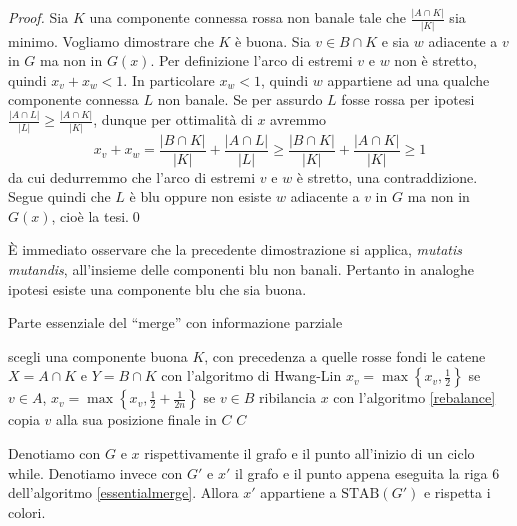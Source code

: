 \begin{proof}
	Sia \(K\) una componente connessa rossa non banale tale che \(\frac{|A\cap K|}{|K|}\) sia minimo. Vogliamo dimostrare che \(K\) è buona. Sia \(v\in B\cap K\) e sia \(w\) adiacente a \(v\) in \(G\) ma non in \(G(x)\). Per definizione l'arco di estremi \(v\) e \(w\) non è stretto, quindi \(x_v+x_w<1\). In particolare \(x_w<1\), quindi \(w\) appartiene ad una qualche componente connessa \(L\) non banale. Se per assurdo \(L\) fosse rossa per ipotesi \(\frac{|A\cap L|}{|L|}\ge\frac{|A\cap K|}{|K|}\), dunque per ottimalità di \(x\) avremmo
	\[x_v+x_w=\frac{|B\cap K|}{|K|}+\frac{|A\cap L|}{|L|}\ge\frac{|B\cap K|}{|K|}+\frac{|A\cap K|}{|K|}\ge 1\]
	da cui dedurremmo che l'arco di estremi \(v\) e \(w\) è stretto, una contraddizione. Segue quindi che \(L\) è blu oppure non esiste \(w\) adiacente a \(v\) in \(G\) ma non in \(G(x)\), cioè la tesi.\qed 
\end{proof}
È immediato osservare che la precedente dimostrazione si applica, \emph{mutatis mutandis}, all'insieme delle componenti blu non banali. Pertanto in analoghe ipotesi esiste una componente blu che sia buona. 
\begin{algorithm}
	\caption{Parte essenziale del ``merge'' con informazione parziale} \label{essentialmerge} 
	\begin{algorithmic}
		[1]  \STATE scegli una componente buona \(K\), con precedenza a quelle rosse \STATE fondi le catene \(X=A\cap K\) e \(Y=B\cap K\) con l'algoritmo di Hwang-Lin  \STATE \(x_v=\max{\left\{x_v, \frac{1}{2}\right\}}\) se \(v\in A\), \(x_v=\max{\left\{x_v, \frac{1}{2}+\frac{1}{2n}\right\}}\) se \(v\in B\) \ENDFOR \STATE ribilancia \(x\) con l'algoritmo \ref{rebalance}   \STATE copia \(v\) alla sua posizione finale in \(C\) \ENDIF \ENDFOR \ENDWHILE \RETURN \(C\) 
	\end{algorithmic}
\end{algorithm}
\begin{lemma}
	\label{evolutionlemma} Denotiamo con \(G\) e \(x\) rispettivamente il grafo e il punto all'inizio di un ciclo while. Denotiamo invece con \(G'\) e \(x'\) il grafo e il punto appena eseguita la riga \(6\) dell'algoritmo \ref{essentialmerge}. Allora \(x'\) appartiene a \(\text{STAB}(G')\) e rispetta i colori. 
\end{lemma}
